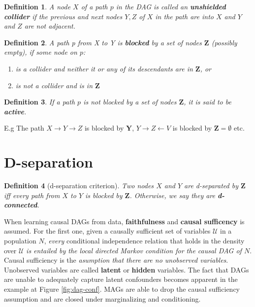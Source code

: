 \documentclass[a4paper]{article}
\newtheorem{definition}{Definition}
\begin{document}
\begin{definition}
	A node $X$ of a path $p$ in the DAG is called an \textbf{unshielded collider} if the previous and next nodes $Y,Z$ of $X$ in the path are into $X$ and $Y$ and $Z$ are not adjacent.
\end{definition}


\begin{definition}
	A path p from X to Y is \textbf{blocked} by a set of nodes $\mathbf{Z}$ (possibly empty), if some node on $p$:
	\begin{enumerate}
		\item is a collider and neither it or any of its descendants are in $\mathbf{Z}$, or
		\item is not a collider and is in $\mathbf{Z}$
	\end{enumerate}
\end{definition}

\begin{definition}
	If a path $p$ is not blocked by a set of nodes $\mathbf{Z}$, it is said to be \textbf{active}.
\end{definition}

E.g The path $X \rightarrow Y \rightarrow Z$ is blocked by $\mathbf{Y}$, $Y \rightarrow Z \leftarrow V$ is blocked by $\mathbf{Z}=\emptyset$ etc.

\section{D-separation}

\begin{definition}[d-separation criterion]Two nodes $X$ and $Y$ are d-separated by $\mathbf{Z}$ iff every path from $X$ to $Y$ is blocked by $\mathbf{Z}$. Otherwise, we say they are \textbf{d-connected}.
\end{definition}
	
When learning causal DAGs from data, \textbf{faithfulness} and \textbf{causal sufficency} is assumed. For the first one, given a causally sufficient set of variables $\mathcal{U}$ in a population $N$, \textit{every} conditional independence relation that holds in the density over $\mathcal{U}$ \textit{is entailed by the local directed Markov condition for the causal DAG of $N$}. Causal sufficiency is the \textit{asumption that there are no unobserved variables}. Unobserved variables are called \textbf{latent} or \textbf{hidden} variables. The fact that DAGs are unable to adequately capture latent confounders becomes apparent in the example at Figure \ref{fig:dag-conf}. MAGs are able to drop the causal sufficiency assumption and are closed under marginalizing and conditioning.
\end{document}
